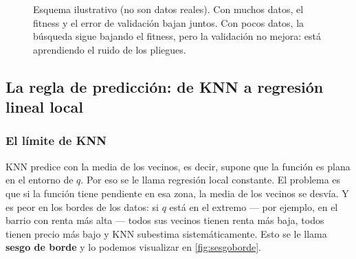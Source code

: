 \begin{figure}[htbp]
\centering
{}
\caption{Esquema ilustrativo (no son datos reales). Con muchos datos, el fitness
y el error de validación bajan juntos. Con pocos datos, la búsqueda sigue
bajando el fitness, pero la validación no mejora: está aprendiendo el ruido de
los pliegues.}
\label{fig:sobreajuste}
\end{figure}

\subsection{La regla de predicción: de KNN a regresión lineal local}
\subsubsection{El límite de KNN}
KNN predice con la media de los vecinos, es decir, supone que la función es plana en el entorno de $q$. Por eso se le llama regresión local constante. El problema es que si la función tiene pendiente en esa zona, la media de los vecinos se desvía. Y es peor en los bordes de los datos: si $q$ está en el extremo --- por ejemplo, en el barrio con renta más alta --- todos sus vecinos tienen renta más baja, todos tienen precio más bajo y KNN subestima sistemáticamente. Esto se le llama \textbf{sesgo de borde} y lo podemos visualizar en \autoref{fig:sesgoborde}.

